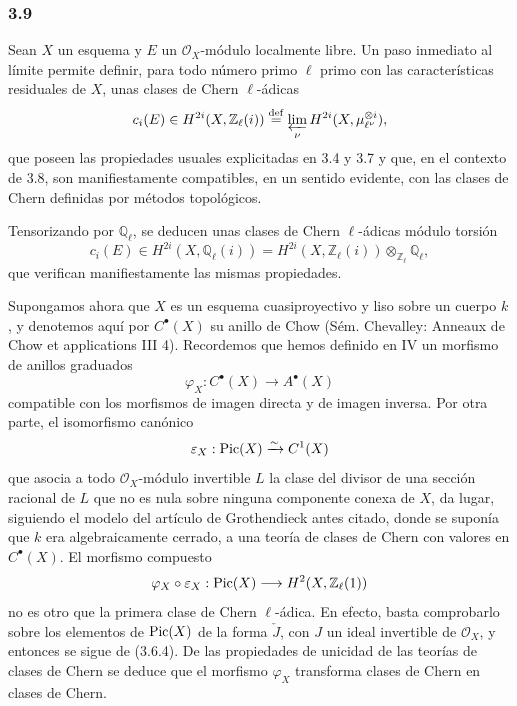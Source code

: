\subsubsection*{3.9}
Sean $X$ un esquema y $E$ un $\mathcal O_X$-módulo localmente libre. Un paso inmediato al límite permite definir, para todo número primo $\ell$ primo con las características residuales de $X$, unas clases de Chern $\ell$-ádicas
\[
c_i(E)\in H^{2i}(X,\mathbb Z_\ell(i))
\stackrel{\mathrm{def}}{=}\varprojlim_\nu H^{2i}(X,\mu_{\ell^\nu}^{\otimes i}),
\]
que poseen las propiedades usuales explicitadas en 3.4 y 3.7 y que, en el contexto de 3.8, son manifiestamente compatibles, en un sentido evidente, con las clases de Chern definidas por métodos topológicos.

Tensorizando por $\mathbb Q_\ell$, se deducen unas clases de Chern $\ell$-ádicas módulo torsión
\[
c_i(E)\in H^{2i}(X,\mathbb Q_\ell(i))
=H^{2i}(X,\mathbb Z_\ell(i))\otimes_{\mathbb Z_\ell}\mathbb Q_\ell,
\]
que verifican manifiestamente las mismas propiedades.

Supongamos ahora que $X$ es un esquema cuasiproyectivo y liso sobre un cuerpo $k$, y denotemos aquí por $C^{\bullet}(X)$ su anillo de Chow (Sém. Chevalley: Anneaux de Chow et applications III 4). Recordemos que hemos definido en IV un morfismo de anillos graduados
\[
\varphi_X:C^{\bullet}(X)\to A^{\bullet}(X)
\]
compatible con los morfismos de imagen directa y de imagen inversa. Por otra parte, el isomorfismo canónico
\[
\varepsilon_X:\operatorname{Pic}(X)\xrightarrow{\sim} C^1(X)
\]
que asocia a todo $\mathcal O_X$-módulo invertible $L$ la clase del divisor de una sección racional de $L$ que no es nula sobre ninguna componente conexa de $X$, da lugar, siguiendo el modelo del artículo de Grothendieck antes citado, donde se suponía que $k$ era algebraicamente cerrado, a una teoría de clases de Chern con valores en $C^{\bullet}(X)$. El morfismo compuesto
\[
\varphi_X\circ\varepsilon_X:\operatorname{Pic}(X)\longrightarrow H^2(X,\mathbb Z_\ell(1))
\]
no es otro que la primera clase de Chern $\ell$-ádica. En efecto, basta comprobarlo sobre los elementos de $\operatorname{Pic}(X)$ de la forma $\check J$, con $J$ un ideal invertible de $\mathcal O_X$, y entonces se sigue de (3.6.4). De las propiedades de unicidad de las teorías de clases de Chern se deduce que el morfismo $\varphi_X$ transforma clases de Chern en clases de Chern.

